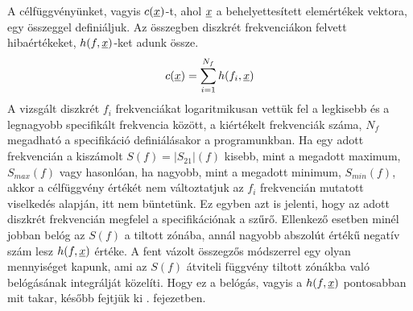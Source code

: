     A célfüggvényünket, vagyis $c(\underline{x})$-t, ahol $\underline{x}$ a behelyettesített elemértékek vektora, egy összeggel definiáljuk. Az összegben diszkrét frekvenciákon felvett hibaértékeket, $h(f,\underline{x})$-ket adunk össze.
    \begin{equation}
        c(\underline{x}) = \sum_{i=1}^{N_f} h(f_i,\underline{x})
    \end{equation}
    A vizsgált diszkrét $f_i$ frekvenciákat logaritmikusan vettük fel a legkisebb és a legnagyobb specifikált frekvencia között, a kiértékelt frekvenciák száma, $N_f$ megadható a specifikáció definiálásakor a programunkban. Ha egy adott frekvencián a kiszámolt $S(f)=|S_{21}|(f)$ kisebb, mint a megadott maximum, $S_{max}(f)$ vagy hasonlóan, ha nagyobb, mint a megadott minimum, $S_{min}(f)$, akkor a célfüggvény értékét nem változtatjuk az $f_i$ frekvencián mutatott viselkedés alapján, itt nem büntetünk. Ez egyben azt is jelenti, hogy az adott diszkrét frekvencián megfelel a specifikációnak a szűrő. Ellenkező esetben minél jobban belóg az $S(f)$ a tiltott zónába, annál nagyobb abszolút értékű negatív szám lesz $h(f,\underline{x})$ értéke. A fent vázolt összegzős módszerrel egy olyan mennyiséget kapunk, ami az $S(f)$ átviteli függvény tiltott zónákba való belógásának integrálját közelíti. Hogy ez a belógás, vagyis a $h(f,\underline{x})$ pontosabban mit takar, később fejtjük ki . fejezetben.
